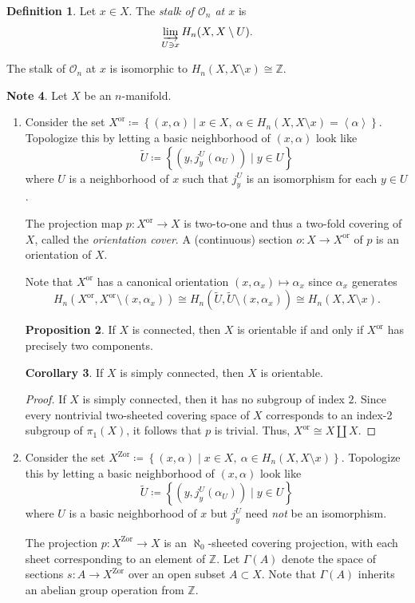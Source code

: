 \documentclass[10pt,letterpaper,cm]{nupset}
\theoremstyle{definition}
\newtheorem{definition}{Definition}[subsection]
\newtheorem{note}[definition]{Note}
\theoremstyle{theorem}
\newtheorem{prop}[definition]{Proposition}
\newtheorem{corollary}[definition]{Corollary}
\theoremstyle{remark}
\newcommand{\Z}{\mathbb Z}
\newcommand{\1}{\mathbb{1}}
\newcommand{\0}{\vec 0}
\begin{document}
\begin{definition}
Let $x\in X$. The \textit{stalk of $\mathcal{O}_n$ at $x$} is  $$\varinjlim_{U\ni x} H_n(X, X \setminus U).$$
\end{definition}


The stalk of $\mathcal{O}_n$ at $x$ is isomorphic to $H_n(X, X \setminus x) \cong \Z$.


\begin{note}
Let $X$ be an $n$-manifold.
\begin{enumerate}
\item Consider the set $X^{\mathrm{or}} \coloneqq  \left\{(x, \alpha) \mid x\in X, \ \alpha \in H_n(X, X \setminus x) =\left\langle \alpha \right\rangle \right\}$. Topologize this by letting a basic neighborhood of $\left(x, \alpha\right)$ look like $$\widetilde{U}\coloneqq  \left\{(y, j_y^U(\alpha_U)) \mid y \in U\right\}$$ where $U$ is a neighborhood of $x$ such that $j_y^U$ is an isomorphism for each $y\in U$.

The projection map $p: X^{\mathrm{or}} \to X$ is two-to-one and thus a two-fold covering of $X$, called the \textit{orientation cover}. A (continuous) section $o: X \to X^{\mathrm{or}}$ of $p$ is an orientation of $X$.

Note that $X^{\mathrm{or}}$ has a canonical orientation $\left(x, \alpha_x\right) \mapsto \alpha_x$ since $\alpha_x$ generates $$H_n(X^{\mathrm{or}}, X^{\mathrm{or}} \setminus (x, \alpha_x)) \cong H_n\left(\widetilde{U}, \widetilde{U} \setminus (x, \alpha_x)\right) \cong H_n(X, X \setminus x).$$
\begin{prop}
If $X$ is connected, then $X$ is orientable if and only if $X^{\mathrm{or}}$ has precisely two components. 
\end{prop}
\begin{corollary}
If $X$ is simply connected, then $X$ is orientable. 
\end{corollary}
\begin{proof}
If $X$ is simply connected, then it has no subgroup of index $2$. Since every nontrivial two-sheeted covering space of $X$ corresponds to an index-2 subgroup of $\pi_1(X)$, it follows that $p$ is trivial. Thus, $X^{\mathrm{or}} \cong X \coprod X$. 
\end{proof}
\item Consider the set $X^{\mathrm{Zor}} \coloneqq  \left\{(x, \alpha) \mid x\in X, \ \alpha \in H_n(X, X \setminus x) \right\}$. Topologize this by letting a basic neighborhood of $\left(x, \alpha\right)$ look like $$\widetilde{U}\coloneqq  \left\{(y, j_y^U(\alpha_U)) \mid y \in U\right\}$$ where $U$ is a basic neighborhood of $x$ but $j_y^U$ need \emph{not} be an isomorphism. 

The projection $p: X^{\mathrm{Zor}} \to X$ is an $\aleph_0$-sheeted covering projection, with each sheet corresponding to an element of $\Z$. Let  $\Gamma(A)$ denote the space of sections $s: A \to X^{\mathrm{Zor}}$ over an open subset $A\subset X$. Note that $\Gamma(A)$ inherits an abelian group operation from $\Z$. 
\end{enumerate}
\end{note}
\end{document}
